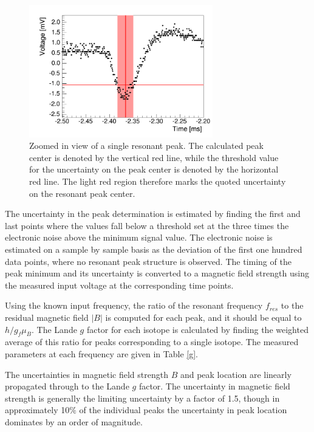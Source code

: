 \begin{figure}[htb]
\includegraphics[width=8cm]{peak_area.png}
\caption{Zoomed in view of a single resonant peak. The calculated peak center is denoted by the vertical red line, while the threshold value for the uncertainty on the peak center is denoted by the horizontal red line. The light red region therefore marks the quoted uncertainty on the resonant peak center. }
\label{ext}
\end{figure}

The uncertainty in the peak determination is estimated by finding the first and last points where the values fall below a threshold set at the three times the electronic noise above the minimum signal value. The electronic noise is estimated on a sample by sample basis as the deviation of the first one hundred data points, where no resonant peak structure is observed. The timing of the peak minimum and its uncertainty is converted to a magnetic field strength using the measured input voltage at the corresponding time points. 

Using the known input frequency, the ratio of the resonant frequency $f_{res}$ to the residual magnetic field $|B|$ is computed for each peak, and it should be equal to $h/g_f \mu_B$. The Lande $g$ factor for each isotope is calculated by finding the weighted average of this ratio for peaks corresponding to a single isotope. The measured parameters at each frequency are given in Table \ref{g}. 

The uncertainties in magnetic field strength $B$ and peak location are linearly propagated through to the Lande $g$ factor. The uncertainty in magnetic field strength is generally the limiting uncertainty by a factor of 1.5, though in approximately 10$\%$ of the individual peaks the uncertainty in peak location dominates by an order of magnitude. 


